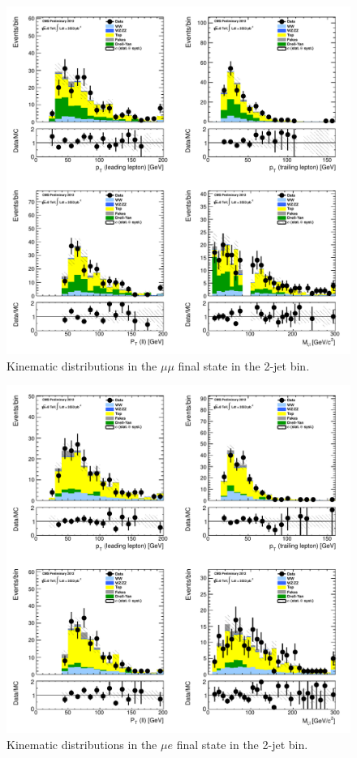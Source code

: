 \begin{figure}[!hbtp]
\centering
\includegraphics[width=1\textwidth]{figures/ww_analysis20_0_ALL_mm_2j.pdf} %
\caption{Kinematic distributions in the $\mu\mu$ final state in the 2-jet bin.}
\label{fig:xs_kinematics_mm_2j}
\end{figure}
\begin{figure}[!hbtp]
\centering
\includegraphics[width=1\textwidth]{figures/ww_analysis20_0_ALL_me_2j.pdf} %
\caption{Kinematic distributions in the $\mu e$ final state in the 2-jet bin.}
\label{fig:xs_kinematics_me_2j}
\end{figure}
